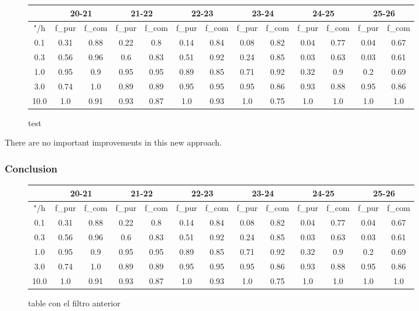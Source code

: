 \documentclass{article}
\begin{document}
\begin{figure}[H]
\centering
\begin{tabular}{|c|c|c|c|c|c|c|c|c|c|c|c|c|}
\hline
\multicolumn{1}{|c|}{} & \multicolumn{2}{|c|}{20-21} & \multicolumn{2}{|c|}{21-22} & \multicolumn{2}{|c|}{22-23} & \multicolumn{2}{|c|}{23-24} & \multicolumn{2}{|c|}{24-25} & \multicolumn{2}{|c|}{25-26}\\
\hline \hline
"/h & f\_pur & f\_com & f\_pur & f\_com & f\_pur & f\_com & f\_pur & f\_com & f\_pur & f\_com & f\_pur & f\_com \\
\hline
0.1 & 0.31 & 0.88 & 0.22 & 0.8 & 0.14 & 0.84 & 0.08 & 0.82 & 0.04 & 0.77 & 0.04 & 0.67\\
\hline
0.3 & 0.56 & 0.96 & 0.6 & 0.83 & 0.51 & 0.92 & 0.24 & 0.85 & 0.03 & 0.63 & 0.03 & 0.61\\
\hline
1.0 & 0.95 & 0.9 & 0.95 & 0.95 & 0.89 & 0.85 & 0.71 & 0.92 & 0.32 & 0.9 & 0.2 & 0.69\\
\hline
3.0 & 0.74 & 1.0 & 0.89 & 0.89 & 0.95 & 0.95 & 0.95 & 0.86 & 0.93 & 0.88 & 0.95 & 0.86\\
\hline
10.0 & 1.0 & 0.91 & 0.93 & 0.87 & 1.0 & 0.93 & 1.0 & 0.75 & 1.0 & 1.0 & 1.0 & 1.0\\
\hline
\end{tabular}
\caption{test}
\end{figure}

There are no important improvements in this new approach.

\subsubsection{Conclusion}

\begin{figure}[H]
\centering
\begin{tabular}{|c|c|c|c|c|c|c|c|c|c|c|c|c|}
\hline
\multicolumn{1}{|c|}{} & \multicolumn{2}{|c|}{20-21} & \multicolumn{2}{|c|}{21-22} & \multicolumn{2}{|c|}{22-23} & \multicolumn{2}{|c|}{23-24} & \multicolumn{2}{|c|}{24-25} & \multicolumn{2}{|c|}{25-26}\\
\hline \hline
"/h & f\_pur & f\_com & f\_pur & f\_com & f\_pur & f\_com & f\_pur & f\_com & f\_pur & f\_com & f\_pur & f\_com \\
\hline
0.1 & 0.31 & 0.88 & 0.22 & 0.8 & 0.14 & 0.84 & 0.08 & 0.82 & 0.04 & 0.77 & 0.04 & 0.67\\
\hline
0.3 & 0.56 & 0.96 & 0.6 & 0.83 & 0.51 & 0.92 & 0.24 & 0.85 & 0.03 & 0.63 & 0.03 & 0.61\\
\hline
1.0 & 0.95 & 0.9 & 0.95 & 0.95 & 0.89 & 0.85 & 0.71 & 0.92 & 0.32 & 0.9 & 0.2 & 0.69\\
\hline
3.0 & 0.74 & 1.0 & 0.89 & 0.89 & 0.95 & 0.95 & 0.95 & 0.86 & 0.93 & 0.88 & 0.95 & 0.86\\
\hline
10.0 & 1.0 & 0.91 & 0.93 & 0.87 & 1.0 & 0.93 & 1.0 & 0.75 & 1.0 & 1.0 & 1.0 & 1.0\\
\hline
\end{tabular}
\caption{table con el filtro anterior}
\end{figure}
\end{document}
